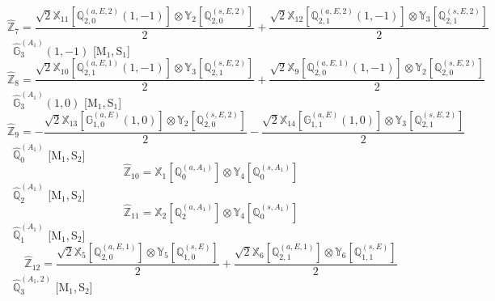 \documentclass[fleqn,10pt,landscape]{article}
\begin{document}
\begin{itemize}
\begin{dmath*}
\hat{\mathbb{Z}}_{7}=\frac{\sqrt{2} \mathbb{X}_{11}[\mathbb{Q}_{2,0}^{(a,E,2)}(1,-1)] \otimes\mathbb{Y}_{2}[\mathbb{Q}_{2,0}^{(s,E,2)}]}{2} + \frac{\sqrt{2} \mathbb{X}_{12}[\mathbb{Q}_{2,1}^{(a,E,2)}(1,-1)] \otimes\mathbb{Y}_{3}[\mathbb{Q}_{2,1}^{(s,E,2)}]}{2}
\end{dmath*}
\vspace{4mm}
\noindent {} $\,\,\,\hat{\mathbb{G}}_{3}^{(A_{1})}(1,-1)$ [M$_{1}$,\,S$_{1}$]
\begin{dmath*}
\hat{\mathbb{Z}}_{8}=\frac{\sqrt{2} \mathbb{X}_{10}[\mathbb{Q}_{2,1}^{(a,E,1)}(1,-1)] \otimes\mathbb{Y}_{3}[\mathbb{Q}_{2,1}^{(s,E,2)}]}{2} + \frac{\sqrt{2} \mathbb{X}_{9}[\mathbb{Q}_{2,0}^{(a,E,1)}(1,-1)] \otimes\mathbb{Y}_{2}[\mathbb{Q}_{2,0}^{(s,E,2)}]}{2}
\end{dmath*}
\vspace{4mm}
\noindent {} $\,\,\,\hat{\mathbb{G}}_{3}^{(A_{1})}(1,0)$ [M$_{1}$,\,S$_{1}$]
\begin{dmath*}
\hat{\mathbb{Z}}_{9}=- \frac{\sqrt{2} \mathbb{X}_{13}[\mathbb{G}_{1,0}^{(a,E)}(1,0)] \otimes\mathbb{Y}_{2}[\mathbb{Q}_{2,0}^{(s,E,2)}]}{2} - \frac{\sqrt{2} \mathbb{X}_{14}[\mathbb{G}_{1,1}^{(a,E)}(1,0)] \otimes\mathbb{Y}_{3}[\mathbb{Q}_{2,1}^{(s,E,2)}]}{2}
\end{dmath*}
\vspace{4mm}
\noindent {} $\,\,\,\hat{\mathbb{Q}}_{0}^{(A_{1})}$ [M$_{1}$,\,S$_{2}$]
\begin{dmath*}
\hat{\mathbb{Z}}_{10}=\mathbb{X}_{1}[\mathbb{Q}_{0}^{(a,A_{1})}] \otimes\mathbb{Y}_{4}[\mathbb{Q}_{0}^{(s,A_{1})}]
\end{dmath*}
\vspace{4mm}
\noindent {} $\,\,\,\hat{\mathbb{Q}}_{2}^{(A_{1})}$ [M$_{1}$,\,S$_{2}$]
\begin{dmath*}
\hat{\mathbb{Z}}_{11}=\mathbb{X}_{2}[\mathbb{Q}_{2}^{(a,A_{1})}] \otimes\mathbb{Y}_{4}[\mathbb{Q}_{0}^{(s,A_{1})}]
\end{dmath*}
\vspace{4mm}
\noindent {} $\,\,\,\hat{\mathbb{Q}}_{1}^{(A_{1})}$ [M$_{1}$,\,S$_{2}$]
\begin{dmath*}
\hat{\mathbb{Z}}_{12}=\frac{\sqrt{2} \mathbb{X}_{5}[\mathbb{Q}_{2,0}^{(a,E,1)}] \otimes\mathbb{Y}_{5}[\mathbb{Q}_{1,0}^{(s,E)}]}{2} + \frac{\sqrt{2} \mathbb{X}_{6}[\mathbb{Q}_{2,1}^{(a,E,1)}] \otimes\mathbb{Y}_{6}[\mathbb{Q}_{1,1}^{(s,E)}]}{2}
\end{dmath*}
\vspace{4mm}
\noindent {} $\,\,\,\hat{\mathbb{Q}}_{3}^{(A_{1},2)}$ [M$_{1}$,\,S$_{2}$]

\end{itemize}
\end{document}
